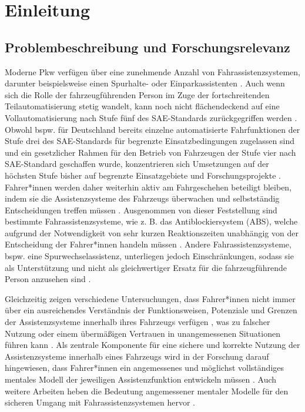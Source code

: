 
\chapter{Einleitung}
\label{chapter:introduction}


\section{Problembeschreibung und Forschungsrelevanz}
\label{sec:problembeschreibung_und_forschungsrelevanz}

Moderne Pkw verfügen über eine zunehmende Anzahl von Fahrassistenzsystemen, 
darunter beispielsweise einen Spurhalte- oder Einparkassistenten \cite{Geisler_autonom2021}. Auch wenn sich die Rolle der fahrzeugführenden Person im Zuge der fortschreitenden Teilautomatisierung stetig wandelt, kann noch nicht flächendeckend auf eine Vollautomatisierung nach Stufe fünf des SAE-Standards \cite{SAE2021J3016} zurückgegriffen werden \cite{Geisler_autonom2021}. Obwohl bspw. für Deutschland bereits einzelne automatisierte Fahrfunktionen der Stufe drei des SAE-Standards \cite{SAE2021J3016} für begrenzte Einsatzbedingungen zugelassen sind und ein gesetzlicher Rahmen für den Betrieb von Fahrzeugen der Stufe vier nach SAE-Standard \cite{SAE2021J3016} geschaffen wurde, konzentrieren sich Umsetzungen auf der höchsten Stufe bisher auf begrenzte Einsatzgebiete und Forschungsprojekte \cite{Bundesregierung2024AutonomesFahren,schrank2024aiding,hua2025status}. Fahrer*innen werden daher weiterhin aktiv am Fahrgeschehen beteiligt bleiben, indem sie die Assistenzsysteme des Fahrzeugs überwachen und selbstständig Entscheidungen treffen müssen \cite{Geisler_autonom2021}. Ausgenommen von dieser Feststellung sind bestimmte Fahrassistenzsysteme, wie z. B. das Antiblockiersystem (ABS), welche aufgrund der Notwendigkeit von sehr kurzen Reaktionszeiten unabhängig von der Entscheidung der Fahrer*innen handeln müssen \cite{Geisler_autonom2021}. Andere Fahrassistenzsysteme, bspw. eine Spurwechselassistenz, unterliegen jedoch Einschränkungen, sodass sie als Unterstützung und nicht als gleichwertiger Ersatz für die fahrzeugführende Person anzusehen sind \cite{Geisler_hci2021}.

Gleichzeitig zeigen verschiedene Untersuchungen, dass Fahrer*innen nicht immer über ein ausreichendes Verständnis der Funktionsweisen, Potenziale und Grenzen der Assistenzsysteme innerhalb ihres Fahrzeugs verfügen \cite {murtaza2023preparing,ayoub2022cause,mason2024developing}, was zu falscher Nutzung oder einem übermäßigen Vertrauen in unangemessenen Situationen führen kann \cite{detjen2021supporting, feinauer2023first,merriman2021challenges}. Als zentrale Komponente für eine sichere und korrekte Nutzung der Assistenzsysteme innerhalb eines Fahrzeugs wird in der Forschung darauf hingewiesen, dass Fahrer*innen ein angemessenes und möglichst vollständiges mentales Modell der jeweiligen Assistenzfunktion entwickeln müssen \cite{feinauer2023first}. Auch weitere Arbeiten heben die Bedeutung angemessener mentaler Modelle für den sicheren Umgang mit Fahrassistenzsystemen hervor \cite{forster2020and, beggiato2013evolution}. 

